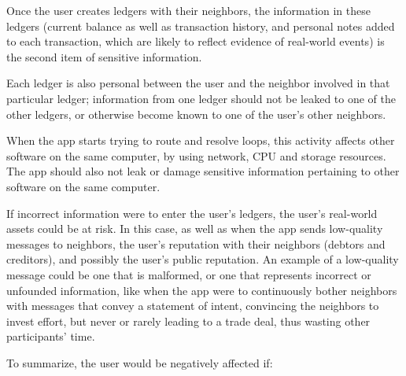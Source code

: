 \documentclass[11pt,twoside,a4paper]{article}
\begin{document}
Once the user creates ledgers with their neighbors, the information in these ledgers (current balance as well as transaction history, and personal notes added to each transaction, which are likely to reflect evidence of real-world events) is the second item of sensitive information.

Each ledger is also personal between the user and the neighbor involved in that particular ledger; information from one ledger should not be leaked to one of the other ledgers, or otherwise become known to one of the user's other neighbors.

When the app starts trying to route and resolve loops, this activity affects other software on the same computer, by using network, CPU and storage resources. The app should also not leak or damage sensitive information pertaining to other software on the same computer.

If incorrect information were to enter the user's ledgers, the user's real-world assets could be at risk.
In this case, as well as when the app sends low-quality messages to neighbors, the user's reputation with their neighbors (debtors and creditors), and possibly the user's public reputation. An example of a low-quality message could be one that is malformed, or one that represents incorrect or unfounded information, like when the app were to continuously bother neighbors with messages that convey a statement of intent, convincing the neighbors to invest effort, but never or rarely leading to a trade deal, thus wasting other participants' time.

To summarize, the user would be negatively affected if:
\end{document}
